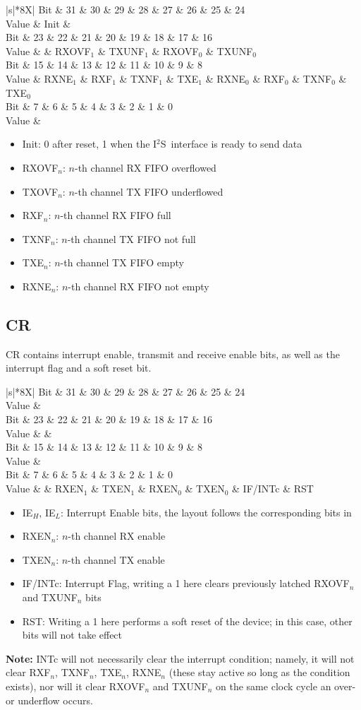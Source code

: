 \documentclass{datasheet}
\newcommand{\iis}{I$^2$S}
\newcommand{\regs}[4]{\begin{tabularx}{\textwidth}{|s|*{8}{X|}}
		\hline
		Bit   & 31 & 30 & 29 & 28 & 27 & 26 & 25 & 24\\\hline
		Value & #1\\\hline\hline
		Bit   & 23 & 22 & 21 & 20 & 19 & 18 & 17 & 16\\\hline
		Value & #2\\\hline\hline
		Bit   & 15 & 14 & 13 & 12 & 11 & 10 &  9 &  8\\\hline
		Value & #3\\\hline\hline
		Bit   &  7 &  6 &  5 &  4 &  3 &  2 &  1 &  0\\\hline
		Value & #4\\\hline
\end{tabularx}}
\newcommand{\rzeroes}[1]{\multicolumn{#1}{c|}{0}}
\newcommand{\note}[1]{\colorbox[HTML]{eeeeff}{
		\begin{minipage}
			{\textwidth}{\Large\bfseries Note:} #1
		\end{minipage}
}}
\begin{document}
	\regs
		{Init & \rzeroes{7}}
		{\rzeroes{4} & RXOVF$_1$ & TXUNF$_1$ & RXOVF$_0$ & TXUNF$_0$}
		{RXNE$_1$ & RXF$_1$ & TXNF$_1$ & TXE$_1$ & RXNE$_0$ & RXF$_0$ & TXNF$_0$ & TXE$_0$}
		{\rzeroes{8}}

	\begin{itemize}
		\item Init: 0 after reset, 1 when the \iis\ interface is ready to send data
		\item RXOVF$_n$: $n$-th channel RX FIFO overflowed
		\item TXOVF$_n$: $n$-th channel TX FIFO underflowed
		\item RXF$_n$: $n$-th channel RX FIFO full
		\item TXNF$_n$: $n$-th channel TX FIFO not full
		\item TXE$_n$: $n$-th channel TX FIFO empty
		\item RXNE$_n$: $n$-th channel RX FIFO not empty
	\end{itemize}

	\subsection{CR}\label{sec:reg:cr}
	CR contains interrupt enable, transmit and receive enable bits, as well as the interrupt flag and a soft reset bit.

	\regs
		{\rzeroes{8}}
		{\rzeroes{4} & }
		{\multicolumn{8}{c|}{IE$_L$}}
		{\rzeroes{2} & RXEN$_1$ & TXEN$_1$ & RXEN$_0$ & TXEN$_0$ & IF/INTc & RST}

	\begin{itemize}
		\item IE$_H$, IE$_L$: Interrupt Enable bits, the layout follows the corresponding bits in 
		\item RXEN$_n$: $n$-th channel RX enable
		\item TXEN$_n$: $n$-th channel TX enable
		\item IF/INTc: Interrupt Flag, writing a 1 here clears previously latched RXOVF$_n$ and TXUNF$_n$ bits
		\item RST: Writing a 1 here performs a soft reset of the device; in this case, other bits will not take effect
	\end{itemize}

	\note{INTc will not necessarily clear the interrupt condition; namely, it will not clear RXF$_n$, TXNF$_n$, TXE$_n$, RXNE$_n$ (these stay active so long as the condition exists), nor will it clear RXOVF$_n$ and TXUNF$_n$ on the same clock cycle an over- or underflow occurs.}
\end{document}
